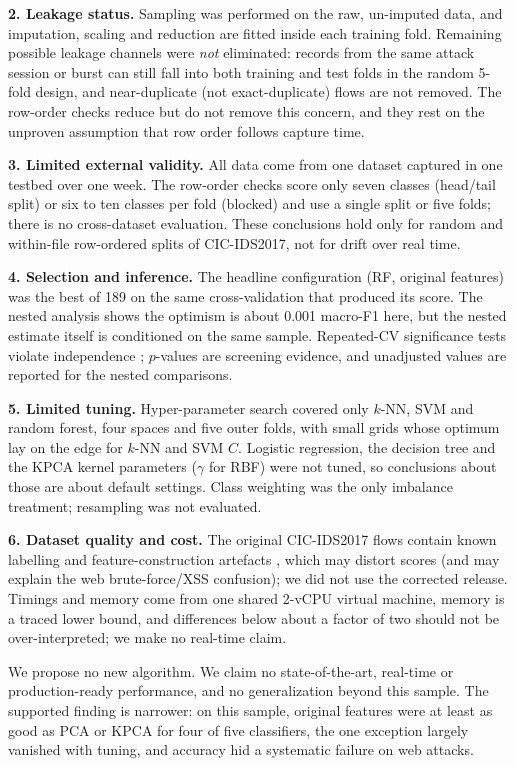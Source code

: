 \documentclass[runningheads]{llncs}
\begin{document}
\textbf{2. Leakage status.} Sampling was performed on the raw, un-imputed data, and imputation, scaling and reduction are fitted inside each training fold. Remaining possible leakage channels were \emph{not} eliminated: records from the same attack session or burst can still fall into both training and test folds in the random 5-fold design, and near-duplicate (not exact-duplicate) flows are not removed. The row-order checks reduce but do not remove this concern, and they rest on the unproven assumption that row order follows capture time.

\textbf{3. Limited external validity.} All data come from one dataset captured in one testbed over one week. The row-order checks score only seven classes (head/tail split) or six to ten classes per fold (blocked) and use a single split or five folds; there is no cross-dataset evaluation. These conclusions hold only for random and within-file row-ordered splits of CIC-IDS2017, not for drift over real time.

\textbf{4. Selection and inference.} The headline configuration (RF, original features) was the best of 189 on the same cross-validation that produced its score. The nested analysis shows the optimism is about 0.001 macro-F1 here, but the nested estimate itself is conditioned on the same sample. Repeated-CV significance tests violate independence \cite{nadeau2003}; $p$-values are screening evidence, and unadjusted values are reported for the nested comparisons.

\textbf{5. Limited tuning.} Hyper-parameter search covered only $k$-NN, SVM and random forest, four spaces and five outer folds, with small grids whose optimum lay on the edge for $k$-NN and SVM $C$. Logistic regression, the decision tree and the KPCA kernel parameters ($\gamma$ for RBF) were not tuned, so conclusions about those are about default settings. Class weighting was the only imbalance treatment; resampling was not evaluated.

\textbf{6. Dataset quality and cost.} The original CIC-IDS2017 flows contain known labelling and feature-construction artefacts \cite{engelen2021}, which may distort scores (and may explain the web brute-force/XSS confusion); we did not use the corrected release. Timings and memory come from one shared 2-vCPU virtual machine, memory is a traced lower bound, and differences below about a factor of two should not be over-interpreted; we make no real-time claim.



We propose no new algorithm. We claim no state-of-the-art, real-time or production-ready performance, and no generalization beyond this sample. The supported finding is narrower: on this sample, original features were at least as good as PCA or KPCA for four of five classifiers, the one exception largely vanished with tuning, and accuracy hid a systematic failure on web attacks.
\end{document}
